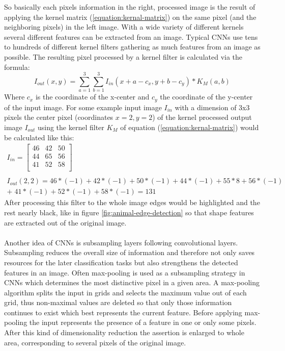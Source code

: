 \documentclass[12pt,twoside]{article}
\theoremstyle{plain}
\theoremstyle{definition}
\theoremstyle{remark}
\begin{document}
So basically each pixels information in the right, processed image is the result of applying the kernel matrix (\ref{equation:kernal-matrix}) on the same pixel (and the neighboring pixels) in the left image. With a wide variety of different kernels several different features can be extracted from an image. Typical CNNs use tens to hundreds of different kernel filters gathering as much features from an image as possible. The resulting pixel processed by a kernel filter is calculated via the formula:
\begin{equation}
I_{out}(x,y) =
\sum_{a=1}^{3} \sum_{b=1}^{3} I_{in} (x+a-c_x, y+b-c_y) * K_M(a,b)
\end{equation}
Where $c_x$ is the coordinate of the x-center and $c_y$ the coordinate of the y-center of the input image.
For some example input image $I_{in}$ with a dimension of 3x3 pixels the center pixel (coordinates $x=2, y=2$) of the kernel processed output image $I_{out}$ using the kernel filter $K_M$ of equation (\ref{equation:kernal-matrix}) would be calculated like this:
\begin{gather*}
	I_{in} =
	\begin{bmatrix}
	46 & 42 & 50 \\
	44 & 65 & 56 \\
	41 & 52 & 58 \\
	\end{bmatrix}
	\\
	\\
	I_{out}(2,2) = 46 * (-1) + 42 * (-1) + 50 * (-1) + 44 * (-1) + 55 * 8 + 56 * (-1)
	\\+ \;41 * (-1) + 52 * (-1) + 58 * (-1) = 131
\end{gather*}
After processing this filter to the whole image edges would be highlighted and the rest nearly black, like in figure \ref{fig:animal-edge-detection} so that shape features are extracted out of the original image.
\\
\\
Another idea of CNNs is subsampling layers following convolutional layers. Subsampling reduces the overall size of information and therefore not only saves resources for the later classification tasks but also strengthens the detected features in an image. Often max-pooling is used as a subsampling strategy in CNNs \cite{DeepNeuralNetworksObjectDetection-Szegedy, ImangeNetClassificationCNN-Krizhevsky} which determines the most distinctive pixel in a given area. A max-pooling algorithm splits the input in grids and selects the maximum value out of each grid, thus non-maximal values are deleted so that only those information continues to exist which best represents the current feature. Before applying max-pooling the input represents the presence of a feature in one or only some pixels. After this kind of dimensionality reduction the assertion is enlarged to whole area, corresponding to several pixels of the original image. 
\end{document}
